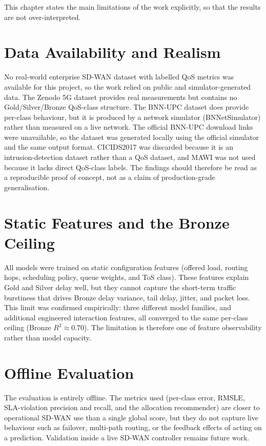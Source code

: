 \documentclass[a4paper,12pt]{Classes/RoboticsLaTeX}
\begin{document}
This chapter states the main limitations of the work explicitly, so that the results are not over-interpreted.

\section{Data Availability and Realism}

No real-world enterprise SD-WAN dataset with labelled QoS metrics was available for this project, so the work relied on public and simulator-generated data. The Zenodo 5G dataset provides real measurements but contains no Gold/Silver/Bronze QoS-class structure. The BNN-UPC dataset does provide per-class behaviour, but it is produced by a network simulator (BNNetSimulator) rather than measured on a live network. The official BNN-UPC download links were unavailable, so the dataset was generated locally using the official simulator and the same output format. CICIDS2017 was discarded because it is an intrusion-detection dataset rather than a QoS dataset, and MAWI was not used because it lacks direct QoS-class labels. The findings should therefore be read as a reproducible proof of concept, not as a claim of production-grade generalisation.

\section{Static Features and the Bronze Ceiling}

All models were trained on static configuration features (offered load, routing hops, scheduling policy, queue weights, and ToS class). These features explain Gold and Silver delay well, but they cannot capture the short-term traffic burstiness that drives Bronze delay variance, tail delay, jitter, and packet loss. This limit was confirmed empirically: three different model families, and additional engineered interaction features, all converged to the same per-class ceiling (Bronze $R^2 \approx 0.70$). The limitation is therefore one of feature observability rather than model capacity.

\section{Offline Evaluation}

The evaluation is entirely offline. The metrics used (per-class error, RMSLE, SLA-violation precision and recall, and the allocation recommender) are closer to operational SD-WAN use than a single global score, but they do not capture live behaviour such as failover, multi-path routing, or the feedback effects of acting on a prediction. Validation inside a live SD-WAN controller remains future work.
\end{document}
